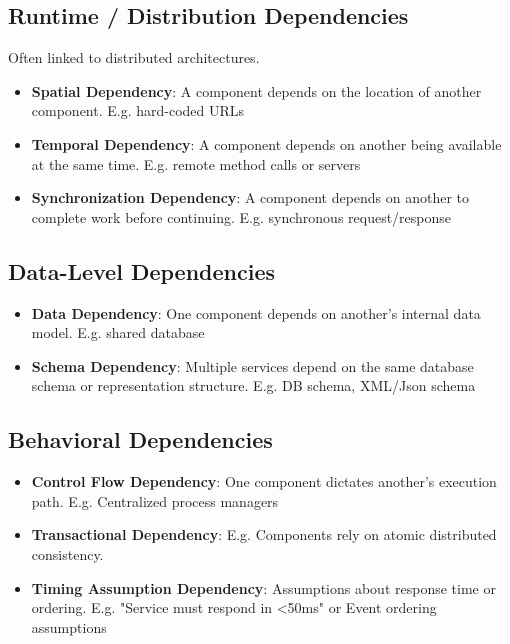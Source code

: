 \subsection{Runtime / Distribution Dependencies}

Often linked to distributed architectures.

\begin{itemize}
  \item \textbf{Spatial Dependency}: A component depends on the location of another component. E.g. hard-coded URLs
  \item \textbf{Temporal Dependency}: A component depends on another being available at the same time. E.g. remote method calls or servers
  \item \textbf{Synchronization Dependency}: A component depends on another to complete work before continuing. E.g.  synchronous request/response
\end{itemize}

\subsection{Data-Level Dependencies}
\begin{itemize}
  \item \textbf{Data Dependency}: One component depends on another’s internal data model. E.g. shared database
  \item \textbf{Schema Dependency}: Multiple services depend on the same database schema or representation structure. E.g. DB schema, XML/Json schema
\end{itemize}

\subsection{Behavioral Dependencies}
\begin{itemize}
  \item \textbf{Control Flow Dependency}: One component dictates another's execution path. E.g. Centralized process managers
  \item \textbf{Transactional Dependency}: E.g. Components rely on atomic distributed consistency.
  \item \textbf{Timing Assumption Dependency}: Assumptions about response time or ordering. E.g. "Service must respond in <50ms" or Event ordering assumptions
\end{itemize}

